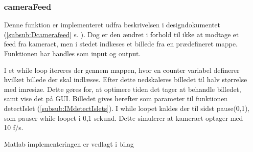\newpage
\subsubsection{cameraFeed}
Denne funktion er implementeret udfra beskrivelsen i designdokumentet (\ref{subsub:Dcamerafeed} s. \pageref{subsub:Dcamerafeed}). Dog er den ændret i forhold til ikke at modtage et feed fra kameraet, men i stedet indlæses et billede fra en prædefineret mappe. 
Funktionen har handles som input og output. 

I et while loop itereres der gennem mappen, hvor en counter variabel definerer hvilket billede der skal indlæses. Efter dette nedskaleres billedet til halv størrelse med imresize. Dette gøres for, at optimere tiden det tager at behandle billedet, samt vise det på GUI. Billedet gives herefter som parameter til funktionen detectIslet (\ref{subsub:IMdetectIslets}). I while loopet kaldes der til sidst pause(0,1), som pauser while loopet i 0,1 sekund. Dette simulerer at kameraet optager med 10 f/s. 

Matlab implementeringen er vedlagt i bilag 